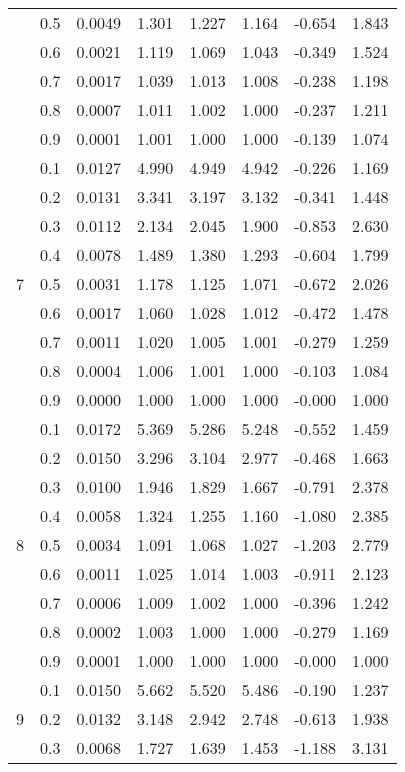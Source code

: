 \documentclass[11pt,a4paper]{report}
\begin{document}
\begin{longtable}{ | c | c || c | c | c | c | c | c | }
 & 0.5 & 0.0049 & 1.301 & 1.227 & 1.164 & -0.654 & 1.843 \\
 & 0.6 & 0.0021 & 1.119 & 1.069 & 1.043 & -0.349 & 1.524 \\
 & 0.7 & 0.0017 & 1.039 & 1.013 & 1.008 & -0.238 & 1.198 \\
 & 0.8 & 0.0007 & 1.011 & 1.002 & 1.000 & -0.237 & 1.211 \\
 & 0.9 & 0.0001 & 1.001 & 1.000 & 1.000 & -0.139 & 1.074 \\
 \hline
\multirow{9}{*}{7} & 0.1 & 0.0127 & 4.990 & 4.949 & 4.942 & -0.226 & 1.169 \\
 & 0.2 & 0.0131 & 3.341 & 3.197 & 3.132 & -0.341 & 1.448 \\
 & 0.3 & 0.0112 & 2.134 & 2.045 & 1.900 & -0.853 & 2.630 \\
 & 0.4 & 0.0078 & 1.489 & 1.380 & 1.293 & -0.604 & 1.799 \\
 & 0.5 & 0.0031 & 1.178 & 1.125 & 1.071 & -0.672 & 2.026 \\
 & 0.6 & 0.0017 & 1.060 & 1.028 & 1.012 & -0.472 & 1.478 \\
 & 0.7 & 0.0011 & 1.020 & 1.005 & 1.001 & -0.279 & 1.259 \\
 & 0.8 & 0.0004 & 1.006 & 1.001 & 1.000 & -0.103 & 1.084 \\
 & 0.9 & 0.0000 & 1.000 & 1.000 & 1.000 & -0.000 & 1.000 \\
 \hline
\multirow{9}{*}{8} & 0.1 & 0.0172 & 5.369 & 5.286 & 5.248 & -0.552 & 1.459 \\
 & 0.2 & 0.0150 & 3.296 & 3.104 & 2.977 & -0.468 & 1.663 \\
 & 0.3 & 0.0100 & 1.946 & 1.829 & 1.667 & -0.791 & 2.378 \\
 & 0.4 & 0.0058 & 1.324 & 1.255 & 1.160 & -1.080 & 2.385 \\
 & 0.5 & 0.0034 & 1.091 & 1.068 & 1.027 & -1.203 & 2.779 \\
 & 0.6 & 0.0011 & 1.025 & 1.014 & 1.003 & -0.911 & 2.123 \\
 & 0.7 & 0.0006 & 1.009 & 1.002 & 1.000 & -0.396 & 1.242 \\
 & 0.8 & 0.0002 & 1.003 & 1.000 & 1.000 & -0.279 & 1.169 \\
 & 0.9 & 0.0001 & 1.000 & 1.000 & 1.000 & -0.000 & 1.000 \\
 \hline
\multirow{9}{*}{9} & 0.1 & 0.0150 & 5.662 & 5.520 & 5.486 & -0.190 & 1.237 \\
 & 0.2 & 0.0132 & 3.148 & 2.942 & 2.748 & -0.613 & 1.938 \\
 & 0.3 & 0.0068 & 1.727 & 1.639 & 1.453 & -1.188 & 3.131 \\

\end{longtable}
\end{document}
